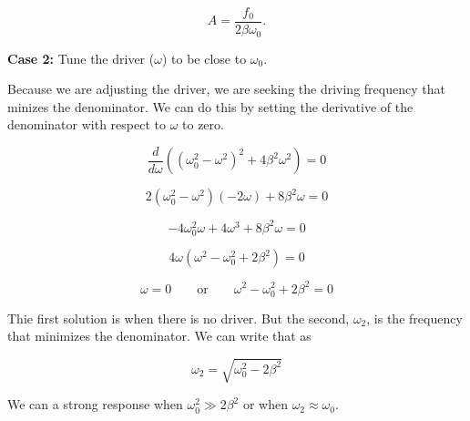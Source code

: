 \documentclass[11pt]{article}
\makeatletter
\newcommand{\boxspacing}{\kern\kvtcb@left@rule\kern\kvtcb@boxsep}
\newcommand{\prompt}[4]{
        {\ttfamily\llap{{\color{#2}[#3]:\hspace{3pt}#4}}\vspace{-\baselineskip}}
    }
\makeatother
\begin{document}
\[A = \dfrac{f_0}{2\beta \omega_0}.\]

\textbf{Case 2:} Tune the driver (\(\omega\)) to be close to
\(\omega_0\).

Because we are adjusting the driver, we are seeking the driving
frequency that minizes the denominator. We can do this by setting the
derivative of the denominator with respect to \(\omega\) to zero.

\[\dfrac{d}{d\omega} \left(\left(\omega_0^2 - \omega^2\right)^2 + 4\beta^2 \omega^2\right) = 0\]

\[2\left(\omega_0^2 - \omega^2\right) \left(-2\omega\right) + 8\beta^2 \omega = 0\]

\[-4\omega_0^2 \omega + 4\omega^3 + 8\beta^2 \omega = 0\]

\[4\omega\left(\omega^2 - \omega_0^2 + 2\beta^2\right) = 0\]

\[\omega = 0 \qquad \text{or} \qquad \omega^2 - \omega_0^2 + 2\beta^2 = 0\]

Thie first solution is when there is no driver. But the second,
\(\omega_2\), is the frequency that minimizes the denominator. We can
write that as

\[\omega_2 = \sqrt{\omega_0^2 - 2\beta^2}\]

We can a strong response when \(\omega_0^2 \gg 2\beta^2\) or when
\(\omega_2 \approx \omega_0\).

    \begin{tcolorbox}[breakable, size=fbox, boxrule=1pt, pad at break*=1mm,colback=cellbackground, colframe=cellborder]
\prompt{In}{incolor}{ }{\boxspacing}
\begin{Verbatim}[commandchars=\\\{\}]

\end{Verbatim}
\end{tcolorbox}

    

    


    
    
    
\end{document}
